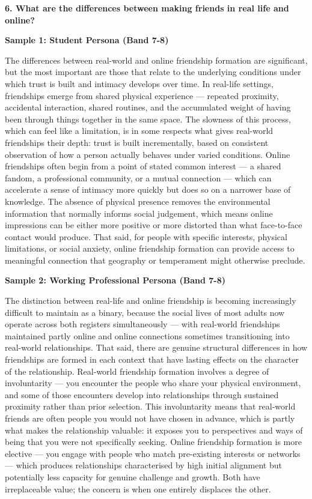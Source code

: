 \separator

\begin{ieltsquestion}
\textbf{6. What are the differences between making friends in real life and online?}
\end{ieltsquestion}
\textbf{Sample 1: Student Persona (Band 7-8)}

The differences between real-world and online friendship formation are significant, but the most important are those that relate to the underlying conditions under which trust is built and intimacy develops over time. In real-life settings, friendships emerge from shared physical experience — repeated proximity, accidental interaction, shared routines, and the accumulated weight of having been through things together in the same space. The slowness of this process, which can feel like a limitation, is in some respects what gives real-world friendships their depth: trust is built incrementally, based on consistent observation of how a person actually behaves under varied conditions. Online friendships often begin from a point of stated common interest — a shared fandom, a professional community, or a mutual connection — which can accelerate a sense of intimacy more quickly but does so on a narrower base of knowledge. The absence of physical presence removes the environmental information that normally informs social judgement, which means online impressions can be either more positive or more distorted than what face-to-face contact would produce. That said, for people with specific interests, physical limitations, or social anxiety, online friendship formation can provide access to meaningful connection that geography or temperament might otherwise preclude.

\textbf{Sample 2: Working Professional Persona (Band 7-8)}

The distinction between real-life and online friendship is becoming increasingly difficult to maintain as a binary, because the social lives of most adults now operate across both registers simultaneously — with real-world friendships maintained partly online and online connections sometimes transitioning into real-world relationships. That said, there are genuine structural differences in how friendships are formed in each context that have lasting effects on the character of the relationship. Real-world friendship formation involves a degree of involuntarity — you encounter the people who share your physical environment, and some of those encounters develop into relationships through sustained proximity rather than prior selection. This involuntarity means that real-world friends are often people you would not have chosen in advance, which is partly what makes the relationship valuable: it exposes you to perspectives and ways of being that you were not specifically seeking. Online friendship formation is more elective — you engage with people who match pre-existing interests or networks — which produces relationships characterised by high initial alignment but potentially less capacity for genuine challenge and growth. Both have irreplaceable value; the concern is when one entirely displaces the other.

